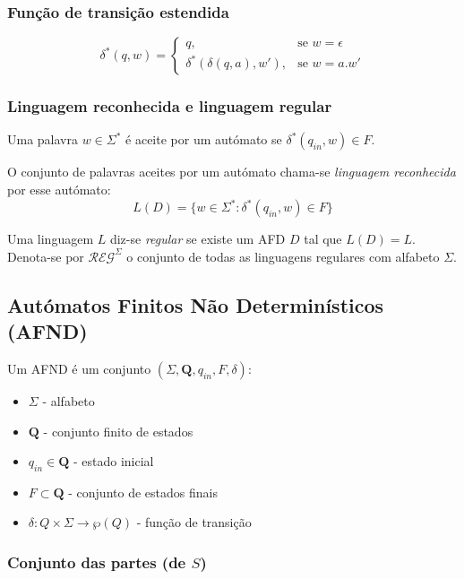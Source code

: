 \documentclass{article}
\begin{document}
\subsubsection{Função de transição estendida}

$$\delta^*(q,w) = \begin{cases}
        q,                        & \text{se } w = \epsilon \\
        \delta^*(\delta(q,a),w'), & \text{se } w = a.w'
    \end{cases}$$

\subsubsection{Linguagem reconhecida e linguagem regular}

Uma palavra $w \in \Sigma^*$ é aceite por um autómato se $\delta^*(q_{in}, w) \in F$.

\noindent O conjunto de palavras aceites por um autómato chama-se \emph{linguagem reconhecida} por esse autómato:
$$L(D) = \{w \in \Sigma^* : \delta^*(q_{in}, w) \in F \}$$

\noindent Uma linguagem $L$ diz-se \emph{regular} se existe um AFD $D$ tal que $L(D) = L$. Denota-se por $\mathcal{REG}^\Sigma$ o conjunto de todas as linguagens regulares com alfabeto $\Sigma$.

\subsection{Autómatos Finitos Não Determinísticos (AFND)}

Um AFND é um conjunto $(\Sigma, \mathbf{Q}, q_{in}, F, \delta)$:

\begin{itemize}
    \item $\Sigma$ - alfabeto
    \item $\mathbf{Q}$ - conjunto finito de estados
    \item $q_{in} \in \mathbf{Q}$ - estado inicial
    \item $F \subset \mathbf{Q}$ - conjunto de estados finais
    \item $\delta : Q \times \Sigma \to \wp(Q)$ - função de transição
\end{itemize}

\subsubsection{Conjunto das partes (de $S$)}
\end{document}
